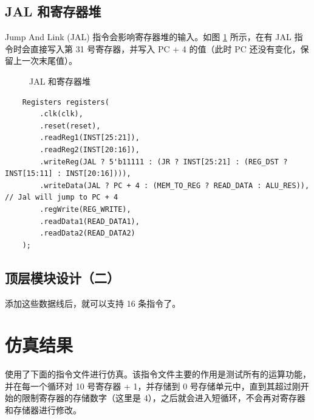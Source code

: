 \documentclass[a4paper,UTF8]{ctexart}
\providecommand{\code}[2]{}
\begin{document}
\subsection{JAL 和寄存器堆}

Jump And Link (JAL) 指令会影响寄存器堆的输入。如图 \ref{fig:jal} 所示，在有 JAL 指令时会直接写入第 31 号寄存器，并写入 PC + 4 的值（此时 PC 还没有变化，保留上一次末尾值）。

\begin{figure}[h]
    \centering
    
    \caption{JAL 和寄存器堆}
    \label{fig:jal}
\end{figure}

\begin{lstlisting}
    Registers registers(
        .clk(clk),
        .reset(reset),
        .readReg1(INST[25:21]),
        .readReg2(INST[20:16]),
        .writeReg(JAL ? 5'b11111 : (JR ? INST[25:21] : (REG_DST ? INST[15:11] : INST[20:16]))),
        .writeData(JAL ? PC + 4 : (MEM_TO_REG ? READ_DATA : ALU_RES)), // Jal will jump to PC + 4
        .regWrite(REG_WRITE),
        .readData1(READ_DATA1),
        .readData2(READ_DATA2)
    );
\end{lstlisting}

\subsection{顶层模块设计（二）}

添加这些数据线后，就可以支持 16 条指令了。

\begin{multicols}{2}
    \code{Top.v}{verilog}
\end{multicols}



\section{仿真结果}

使用了下面的指令文件进行仿真。该指令文件主要的作用是测试所有的运算功能，并在每一个循环对 10 号寄存器 + 1，并存储到 0 号存储单元中，直到其超过刚开始的限制寄存器的存储数字（这里是 4），之后就会进入短循环，不会再对寄存器和存储器进行修改。
\end{document}
